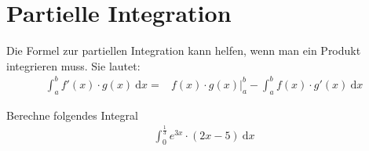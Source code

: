 \documentclass[11pt, a4paper]{article}
\newcommand{\intend}[1][]{\ \mathrm{d}#1}
\newcommand{\derivative}[2][]{\ \frac{\mathrm{d}#1}{\mathrm{d}#2}}
\newcommand\braces[1]{\left(#1\right)}
\newcommand\brackets[1]{\left[#1\right]}
\newcommand{\gerquote}[1]{\glqq#1\grqq}
\newif\ifshowsolution
\begin{document}
\newpage
\section{Partielle Integration} %
Die Formel zur partiellen Integration kann helfen, wenn man ein Produkt integrieren muss. Sie lautet:
\begin{align}
	\int_a^b f'(x) \cdot g(x) \intend{x} =& f(x) \cdot g(x)\vert_a^b - \int_a^b f(x) \cdot g'(x) \intend{x}
	\label{eq:partielleIntegration}
\end{align}

\newcommand{\lowerBorder}{{0}}
\newcommand{\upperBorder}{{\frac{1}{3}}}
Berechne folgendes Integral
\begin{align*}
	\int_\lowerBorder^\upperBorder e^{3x} \cdot (2x - 5) \intend{x}
\end{align*}

\ifshowsolution
	\begin{align*}
		\intertext{Wähle $f'$ so, dass es leicht zu integrieren ist und $g$ so, dass es beim Ableiten \gerquote{kleiner wird} oder \gerquote{verschwindet}, wie z.b. ein Polynom:}
		& \int_\lowerBorder^\upperBorder \underbrace{e^{3x}}_{f'} \cdot \underbrace{\braces{2x - 5}}_{g}\intend{x}\\
		\intertext{Um die Formel anwenden zu können, benötigen wir die Stammfunktion $f$ von $f'$ und die Ableitung $g'$ von $g$.}
		f &= \int f' \intend{x} =\int e^{3x} \intend{x} =\frac{1}{3} e^{3x}\\
		g' &= \derivative{x} (2x - 5) = 2\\
		\intertext{In Formel \eqref{eq:partielleIntegration} müssen wir nur noch die entsprechenden Ersetzungen machen:}
		& f(x) \cdot g(x)\vert_a^b - \int_a^b f(x) \cdot g'(x) \intend{x}\\
		&= \brackets{\frac{1}{3} e^{3x} \cdot \braces{2x - 5}}_\lowerBorder^\upperBorder - \int_\lowerBorder^\upperBorder \frac{1}{3} e^{3x} \cdot 2 \intend{x}\\
		&= \braces{\frac{1}{3} e^1 \cdot \braces{2\cdot \frac{1}{3} - 5} - \frac{1}{3}e^0 \cdot \braces{0 - 5}} - \frac{2}{3} \int_\lowerBorder^\upperBorder e^{3x} \intend{x}\\
		&= \braces{{\frac{1}{3}e \cdot \braces{-\frac{13}{3}}} - \braces{-\frac{5}{3}}} - \frac{2}{3}\brackets{\frac{1}{3}e^{3x}}_\lowerBorder^\upperBorder\\
		&= \braces{-\frac{13}{9}e + \frac{5}{3}} - \frac{2}{9} \brackets{e^{3x}}\lowerBorder^\upperBorder\\
		&= -\frac{13}{9}e + \frac{5}{3} - \frac{2}{9} \braces{e^1 - e^0}\\
		&= -\frac{15}{9}e + \frac{17}{9}
	\end{align*}
\fi
\end{document}
